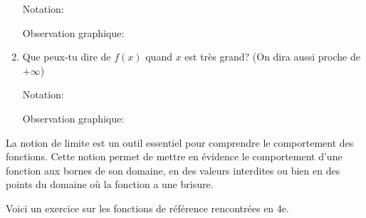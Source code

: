 \documentclass[a4paper,12pt]{report}
\begin{document}
\begin{enumerate}
\dotfill

\dotfill

Notation:  \dotfill

Observation graphique: \dotfill
\item Que peux-tu dire de \(f(x)\) quand \(x\) est très grand? (On dira
aussi proche de \(+\infty\))

\dotfill

\dotfill

Notation: \dotfill

Observation graphique: \dotfill
\end{enumerate}

La notion de limite est un outil essentiel pour comprendre le
comportement des fonctions. Cette notion permet de mettre en évidence
le comportement d'une fonction aux bornes de son domaine, en des
valeurs interdites ou bien en des points du domaine où la fonction a
une brisure.

Voici un exercice sur les fonctions de référence rencontrées en
4e.
\end{document}

